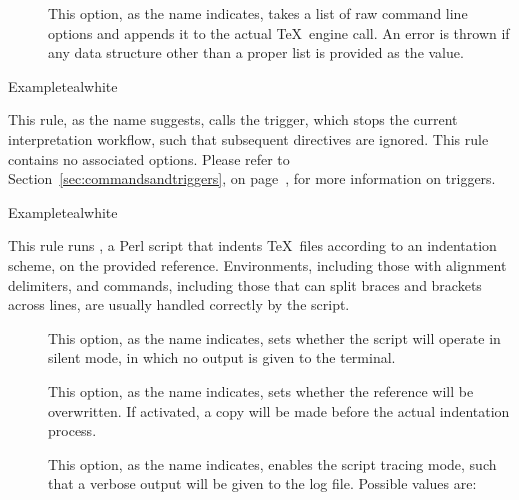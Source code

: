\begin{description}
\begin{description}
\item[] This option, as the name indicates, takes a list of raw command line options and appends it to the actual \TeX\ engine call. An error is thrown if any data structure other than a proper list is provided as the value.
\end{description}

\begin{codebox}{Example}{teal}{\icnote}{white}
\end{codebox}

\item[\rulebox{halt}{Heiko Oberdiek, Paulo Cereda}] This rule, as the name suggests, calls the  trigger, which stops the current interpretation workflow, such that subsequent directives are ignored. This rule contains no associated options. Please refer to Section~\ref{sec:commandsandtriggers}, on page~\pageref{sec:commandsandtriggers}, for more information on triggers.

\begin{codebox}{Example}{teal}{\icnote}{white}
\end{codebox}

\item[\rulebox{indent}{Chris Hughes, Paulo Cereda}] This rule runs , a Perl script that indents \TeX\ files according to an indentation scheme, on the provided  reference. Environments, including those with alignment delimiters, and commands, including those that can split braces and brackets across lines, are usually handled correctly by the script.

\begin{description}
\item[] This option, as the name indicates, sets whether the script will operate in silent mode, in which no output is given to the terminal.

\item[] This option, as the name indicates, sets whether the  reference will be overwritten. If activated, a copy will be made before the actual indentation process. 

\item[] This option, as the name indicates, enables the script tracing mode, such that a verbose output will be given to the  log file. Possible values are:


\end{description}
\end{description}
